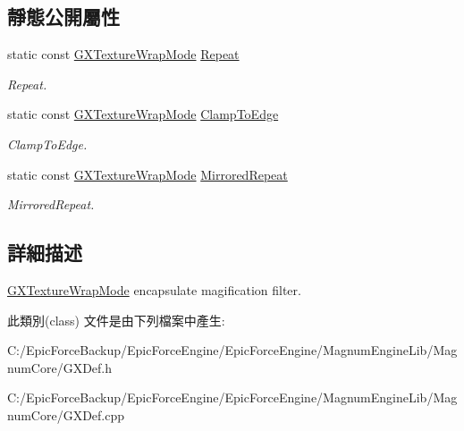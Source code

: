 \subsection*{靜態公開屬性}
\begin{DoxyCompactItemize}
\item 
static const \hyperlink{class_magnum_1_1_g_x_texture_wrap_mode}{G\+X\+Texture\+Wrap\+Mode} \hyperlink{class_magnum_1_1_g_x_texture_wrap_mode_a179694508524c17875cfcda21ecd1227}{Repeat}\hypertarget{class_magnum_1_1_g_x_texture_wrap_mode_a179694508524c17875cfcda21ecd1227}{}\label{class_magnum_1_1_g_x_texture_wrap_mode_a179694508524c17875cfcda21ecd1227}

\begin{DoxyCompactList}\small\item\em Repeat. \end{DoxyCompactList}\item 
static const \hyperlink{class_magnum_1_1_g_x_texture_wrap_mode}{G\+X\+Texture\+Wrap\+Mode} \hyperlink{class_magnum_1_1_g_x_texture_wrap_mode_a031f2757a19eb2046eb679ca53f5ad3a}{Clamp\+To\+Edge}\hypertarget{class_magnum_1_1_g_x_texture_wrap_mode_a031f2757a19eb2046eb679ca53f5ad3a}{}\label{class_magnum_1_1_g_x_texture_wrap_mode_a031f2757a19eb2046eb679ca53f5ad3a}

\begin{DoxyCompactList}\small\item\em Clamp\+To\+Edge. \end{DoxyCompactList}\item 
static const \hyperlink{class_magnum_1_1_g_x_texture_wrap_mode}{G\+X\+Texture\+Wrap\+Mode} \hyperlink{class_magnum_1_1_g_x_texture_wrap_mode_ab02633f94fd30b5f46dfdded94133e5d}{Mirrored\+Repeat}\hypertarget{class_magnum_1_1_g_x_texture_wrap_mode_ab02633f94fd30b5f46dfdded94133e5d}{}\label{class_magnum_1_1_g_x_texture_wrap_mode_ab02633f94fd30b5f46dfdded94133e5d}

\begin{DoxyCompactList}\small\item\em Mirrored\+Repeat. \end{DoxyCompactList}\end{DoxyCompactItemize}


\subsection{詳細描述}
\hyperlink{class_magnum_1_1_g_x_texture_wrap_mode}{G\+X\+Texture\+Wrap\+Mode} encapsulate magification filter. 

此類別(class) 文件是由下列檔案中產生\+:\begin{DoxyCompactItemize}
\item 
C\+:/\+Epic\+Force\+Backup/\+Epic\+Force\+Engine/\+Epic\+Force\+Engine/\+Magnum\+Engine\+Lib/\+Magnum\+Core/G\+X\+Def.\+h\item 
C\+:/\+Epic\+Force\+Backup/\+Epic\+Force\+Engine/\+Epic\+Force\+Engine/\+Magnum\+Engine\+Lib/\+Magnum\+Core/G\+X\+Def.\+cpp\end{DoxyCompactItemize}
